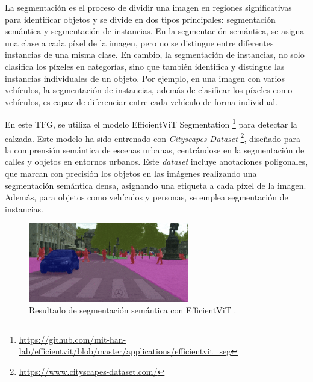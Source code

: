 La segmentación es el proceso de dividir una imagen en regiones significativas para identificar objetos y se divide en dos tipos principales: segmentación semántica y segmentación de instancias. En la segmentación semántica, se asigna una clase a cada píxel de la imagen, pero no se distingue entre diferentes instancias de una misma clase. En cambio, la segmentación de instancias, no solo clasifica los píxeles en categorías, sino que también identifica y distingue las instancias individuales de un objeto. Por ejemplo, en una imagen con varios vehículos, la segmentación de instancias, además de clasificar los píxeles como vehículos, es capaz de diferenciar entre cada vehículo de forma individual.

En este \ac{TFG}, se utiliza el modelo EfficientViT Segmentation \footnote{\url{ https://github.com/mit-han-lab/efficientvit/blob/master/applications/efficientvit_seg}} para detectar la calzada. Este modelo ha sido entrenado con \textit{Cityscapes Dataset} \footnote{\url{https://www.cityscapes-dataset.com/}}, diseñado para la comprensión semántica de escenas urbanas, centrándose en la segmentación de calles y objetos en entornos urbanos. Este \textit{dataset} incluye anotaciones poligonales, que marcan con precisión los objetos en las imágenes realizando una segmentación semántica densa, asignando una etiqueta a cada píxel de la imagen. Además, para objetos como vehículos y personas, se emplea segmentación de instancias.

\begin{figure}[ht]
\begin{center}
\includegraphics[width=7cm]{figs/Plataformas_Desarollo/resultado_ef.png}
\end{center}
\caption{Resultado de segmentación semántica con EfficientViT \cite{efficientvit-gif}.}
\label{foto_ef}
\end{figure}

